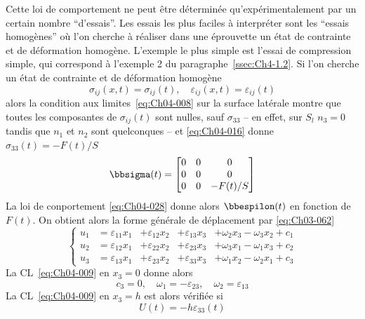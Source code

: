 Cette loi de comportement ne peut être déterminée qu'expérimentale­ment par un certain nombre ``d'essais''.
Les essais les plus faciles à interpréter sont les ``essais homogènes'' où l'on cherche à réaliser dans une éprouvette un état de contrainte et de déformation homogène.
L'exemple le plus simple est l'essai de compression simple, qui correspond à l'exemple 2 du paragraphe~\ref{ssec:Ch4-1.2}.
Si l'on cherche un état de contrainte et de déformation homogène
\begin{equation}
    \sigma_{ij} (x,t) = \sigma_{ij}(t), \quad \varepsilon_{ij}(x,t) = \varepsilon_{ij}(t)
    \label{eq:Ch04-029}
\end{equation}
alors la condition aux limites~\eqref{eq:Ch04-008} sur la surface latérale montre que toutes les composantes de $\sigma_{ij}(t)$ sont nulles, sauf $\sigma_{33}$ -- en effet, sur $S_l$ $n_3=0$ tandis que $n_1$ et $n_2$ sont quelconques -- et \eqref{eq:Ch04-016} donne $\sigma_{33}(t)=-F(t)/S$
\begin{equation}
    \bbsigma(t) = \begin{bmatrix}
        0 & 0 & 0 \\
        0 & 0 & 0 \\
        0 & 0 & -F(t)/S
    \end{bmatrix}
    \label{eq:Ch04-030}
\end{equation}
La loi de conportement \eqref{eq:Ch04-028} donne alors $\bbespilon(t)$ en fonction de $F(t)$.
On obtient alors la forme générale de déplacement par \eqref{eq:Ch03-062}
\begin{equation}
    \left\{
    \begin{aligned}
        u_1 &= \varepsilon_{11} x_1 &+ \varepsilon_{12}x_2 &+ \varepsilon_{13}x_3 &+ \omega_{2}x_3 - \omega_{3} x_2 +c_1\\
        u_2 &= \varepsilon_{12} x_1 &+ \varepsilon_{22}x_2 &+ \varepsilon_{23}x_3 &+ \omega_{3}x_1 - \omega_{1} x_3 +c_2\\
        u_3 &= \varepsilon_{13} x_1 &+ \varepsilon_{23}x_2 &+ \varepsilon_{33}x_3 &+ \omega_{1}x_2 - \omega_{2} x_1 +c_3
    \end{aligned}
    \right.
    \label{eq:Ch04-031}
\end{equation}
La CL~\eqref{eq:Ch04-009} en $x_3 =0$ donne alors
\begin{equation*}
    c_3 = 0, \quad \omega_1 = -\varepsilon_{23}, \quad \omega_2 = \varepsilon_{13}
\end{equation*}
La CL~\eqref{eq:Ch04-009}  en $x_3=h$ est alors vérifiée si
\begin{equation}
    U(t) = -h \varepsilon_{33}(t)
    \label{eq:Ch04-032}
\end{equation}
